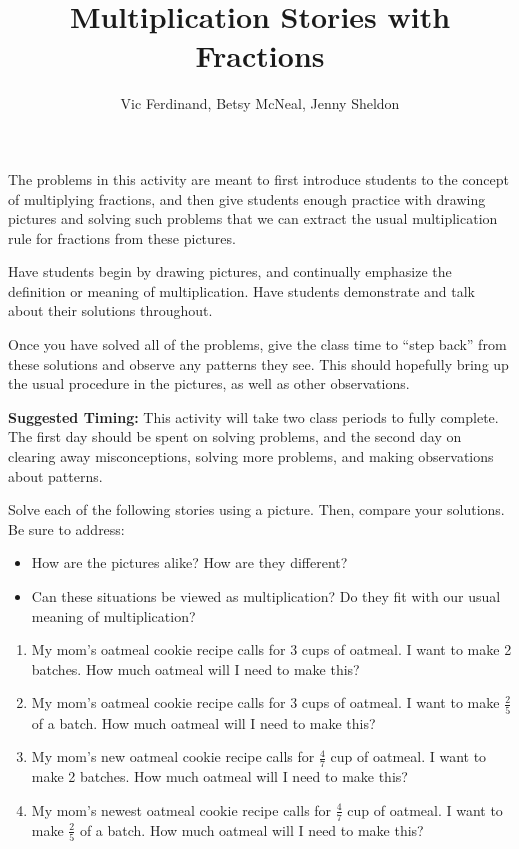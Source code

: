 \documentclass{ximera}
\title{Multiplication Stories with Fractions}
\author{Vic Ferdinand, Betsy McNeal, Jenny Sheldon}
\begin{document}
\begin{abstract} \end{abstract}
\maketitle

\begin{instructorIntro}
The problems in this activity are meant to first introduce students to the concept of multiplying fractions, and then give students enough practice with drawing pictures and solving such problems that we can extract the usual multiplication rule for fractions from these pictures.  

Have students begin by drawing pictures, and continually emphasize the definition or meaning of multiplication.  Have students demonstrate and talk about their solutions throughout.  

Once you have solved all of the problems, give the class time to ``step back'' from these solutions and observe any patterns they see.  This should hopefully bring up the usual procedure in the pictures, as well as other observations.

{\bf Suggested Timing:} This activity will take two class periods to fully complete.  The first day should be spent on solving problems, and the second day on clearing away misconceptions, solving more problems, and making observations about patterns.
\end{instructorIntro}


\begin{problem}
 Solve each of the following stories using a picture.  Then, compare your solutions.  Be sure to address:   
\begin{itemize}
    \item How are the pictures alike?  How are they different?
    \item Can these situations be viewed as multiplication?  Do they fit with our usual meaning of multiplication?
\end{itemize}

\begin{enumerate}%
    \item My mom's oatmeal cookie recipe calls for 3 cups of oatmeal.  
I want to make 2 batches.
How much oatmeal will I need to make this?
    \item My mom's oatmeal cookie recipe calls for 3 cups of oatmeal.  
I want to make $\frac{2}{5}$ of a batch.
How much oatmeal will I need to make this?
    \item My mom's new oatmeal cookie recipe calls for $\frac{4}{7}$ cup of oatmeal.  
I want to make 2 batches.
How much oatmeal will I need to make this?
    \item My mom's newest oatmeal cookie recipe calls for  $\frac{4}{7}$ cup of oatmeal.  
I want to make $\frac{2}{5}$ of a batch.
How much oatmeal will I need to make this?
\end{enumerate}

\end{problem}
\end{document}
